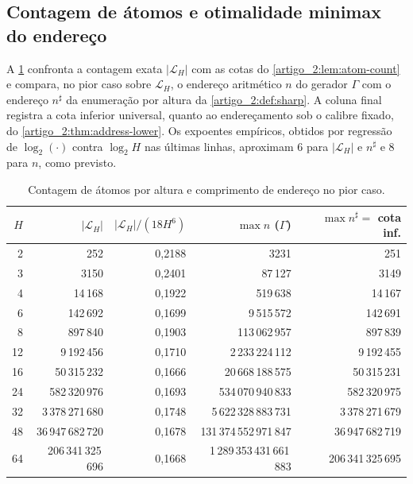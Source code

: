 \documentclass[12pt,a4paper]{article}
\theoremstyle{preciso}
\theoremstyle{definition}
\newcommand{\Library}{\mathcal{L}}
\theoremstyle{preciso}
\theoremstyle{preciso}
\theoremstyle{preciso}
\theoremstyle{preciso}
\theoremstyle{definition}
\theoremstyle{preciso}
\theoremstyle{definition}
\theoremstyle{preciso}
\theoremstyle{preciso}
\theoremstyle{definition}
\begin{document}
\subsection{Contagem de átomos e otimalidade minimax do endereço}

A \cref{artigo_2:tab:enderecos-pt} confronta a contagem exata $|\Library_H|$ com as cotas do
\cref{artigo_2:lem:atom-count} e compara, no pior caso sobre $\Library_H$, o endereço
aritmético $n$ do gerador $\Gamma$ com o endereço $n^\sharp$ da enumeração por
altura da \cref{artigo_2:def:sharp}. A coluna final registra a cota inferior universal,
quanto ao endereçamento sob o calibre fixado, do
\cref{artigo_2:thm:address-lower}. Os expoentes empíricos, obtidos por regressão de
$\log_2(\cdot)$ contra $\log_2H$ nas últimas linhas, aproximam $6$ para
$|\Library_H|$ e $n^\sharp$ e $8$ para $n$, como previsto.

\begin{table}[t]
\centering
\caption{Contagem de átomos por altura e comprimento de endereço no pior caso.}
\label{artigo_2:tab:enderecos-pt}
\small
\begin{tabular}{rrrrr}
\toprule
$H$ & $|\Library_H|$ & $|\Library_H|/(18H^6)$ & $\max n$ ($\Gamma$) & $\max n^\sharp=$ cota inf.\\
\midrule
2 & 252 & 0{,}2188 & 3231 & 251\\
3 & 3150 & 0{,}2401 & 87\,127 & 3149\\
4 & 14\,168 & 0{,}1922 & 519\,638 & 14\,167\\
6 & 142\,692 & 0{,}1699 & 9\,515\,572 & 142\,691\\
8 & 897\,840 & 0{,}1903 & 113\,062\,957 & 897\,839\\
12 & 9\,192\,456 & 0{,}1710 & 2\,233\,224\,112 & 9\,192\,455\\
16 & 50\,315\,232 & 0{,}1666 & 20\,668\,188\,575 & 50\,315\,231\\
24 & 582\,320\,976 & 0{,}1693 & 534\,070\,940\,833 & 582\,320\,975\\
32 & 3\,378\,271\,680 & 0{,}1748 & 5\,622\,328\,883\,731 & 3\,378\,271\,679\\
48 & 36\,947\,682\,720 & 0{,}1678 & 131\,374\,552\,971\,847 & 36\,947\,682\,719\\
64 & 206\,341\,325\,696 & 0{,}1668 & 1\,289\,353\,431\,661\,883 & 206\,341\,325\,695\\
\bottomrule
\end{tabular}

\end{table}
\end{document}

